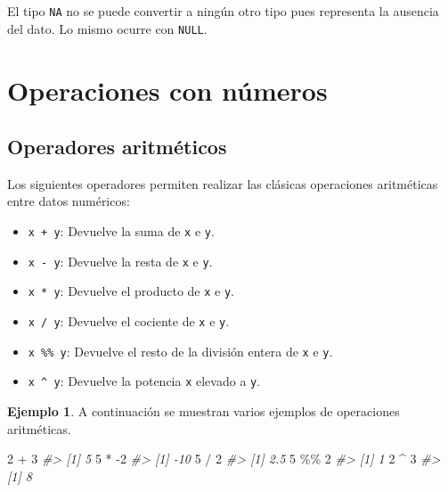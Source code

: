 \documentclass[
]{book}
\newenvironment{Shaded}{\begin{snugshade}}{\end{snugshade}}
\newcommand{\CommentTok}[1]{\textcolor[rgb]{0.56,0.35,0.01}{\textit{#1}}}
\newcommand{\DecValTok}[1]{\textcolor[rgb]{0.00,0.00,0.81}{#1}}
\newcommand{\SpecialCharTok}[1]{\textcolor[rgb]{0.00,0.00,0.00}{#1}}
\providecommand{\tightlist}{%
  \setlength{\itemsep}{0pt}\setlength{\parskip}{0pt}}
\theoremstyle{definition}
\theoremstyle{definition}
\newtheorem{example}{Ejemplo}[chapter]
\theoremstyle{definition}
\theoremstyle{definition}
\theoremstyle{remark}
\begin{document}
El tipo \texttt{NA} no se puede convertir a ningún otro tipo pues representa la ausencia del dato. Lo mismo ocurre con \texttt{NULL}.

\hypertarget{operaciones-con-nuxfameros}{%
\section{Operaciones con números}\label{operaciones-con-nuxfameros}}

\hypertarget{operadores-aritmuxe9ticos}{%
\subsection{Operadores aritméticos}\label{operadores-aritmuxe9ticos}}

Los siguientes operadores permiten realizar las clásicas operaciones aritméticas entre datos numéricos:

\begin{itemize}
\tightlist
\item
  \texttt{x\ +\ y}: Devuelve la suma de \texttt{x} e \texttt{y}.
\item
  \texttt{x\ -\ y}: Devuelve la resta de \texttt{x} e \texttt{y}.
\item
  \texttt{x\ *\ y}: Devuelve el producto de \texttt{x} e \texttt{y}.
\item
  \texttt{x\ /\ y}: Devuelve el cociente de \texttt{x} e \texttt{y}.\\
\item
  \texttt{x\ \%\%\ y}: Devuelve el resto de la división entera de \texttt{x} e \texttt{y}.\\
\item
  \texttt{x\ \^{}\ y}: Devuelve la potencia \texttt{x} elevado a \texttt{y}.
\end{itemize}

\begin{example}

A continuación se muestran varios ejemplos de operaciones aritméticas.

\begin{Shaded}
\begin{Highlighting}[]
\DecValTok{2} \SpecialCharTok{+} \DecValTok{3}
\CommentTok{\#\textgreater{} [1] 5}
\DecValTok{5} \SpecialCharTok{*} \SpecialCharTok{{-}}\DecValTok{2}
\CommentTok{\#\textgreater{} [1] {-}10}
\DecValTok{5} \SpecialCharTok{/} \DecValTok{2}
\CommentTok{\#\textgreater{} [1] 2.5}
\DecValTok{5} \SpecialCharTok{\%\%} \DecValTok{2}
\CommentTok{\#\textgreater{} [1] 1}
\DecValTok{2} \SpecialCharTok{\^{}} \DecValTok{3}
\CommentTok{\#\textgreater{} [1] 8}
\end{Highlighting}
\end{Shaded}

\end{example}
\end{document}
